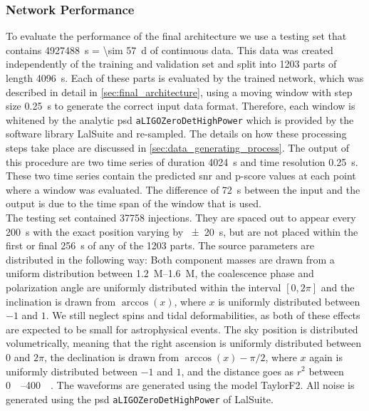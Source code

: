 \subsubsection{Network Performance}\label{sec:network_performance}
To evaluate the performance of the final architecture we use a testing set that contains \SI{4927488}{\s} = \SI{\sim 57}{\day} of continuous data. This data was created independently of the training and validation set and split into 1203 parts of length \SI{4096}{\s}. Each of these parts is evaluated by the trained network, which was described in detail in \autoref{sec:final_architecture}, using a moving window with step size \SI{0.25}{\s} to generate the correct input data format. Therefore, each window is whitened by the analytic \gls{psd} \verb|aLIGOZeroDetHighPower| which is provided by the software library LalSuite \cite{lalsuite} and re-sampled. The details on how these processing steps take place are discussed in \autoref{sec:data_generating_process}. The output of this procedure are two time series of duration \SI{4024}{\s} and time resolution \SI{0.25}{\s}. These two time series contain the predicted \gls{snr} and p-score values at each point where a window was evaluated. The difference of \SI{72}{\s} between the input and the output is due to the time span of the window that is used.\\
The testing set contained 37758 injections. They are spaced out to appear every \SI{200}{\s} with the exact position varying by \SI{\pm 20}{\s}, but are not placed within the first or final \SI{256}{\s} of any of the 1203 parts. The source parameters are distributed in the following way: Both component masses are drawn from a uniform distribution between \SIrange{1.2}{1.6}{M_\odot}, the coalescence phase and polarization angle are uniformly distributed within the interval $\left[0,2\pi\right]$ and the inclination is drawn from $\arccos(x)$, where $x$ is uniformly distributed between $-1$ and $1$. We still neglect spins and tidal deformabilities, as both of these effects are expected to be small for astrophysical events. The sky position is distributed volumetrically, meaning that the right ascension is uniformly distributed between $0$ and $2\pi$, the declination is drawn from $\arccos(x)-\pi/2$, where $x$ again is uniformly distributed between $-1$ and $1$, and the distance goes as $r^2$ between \SIrange{0}{400}{\mega\parsec}. The waveforms are generated using the model TaylorF2. All noise is generated using the \gls{psd} \verb|aLIGOZeroDetHighPower| of LalSuite.\smallskip\\
